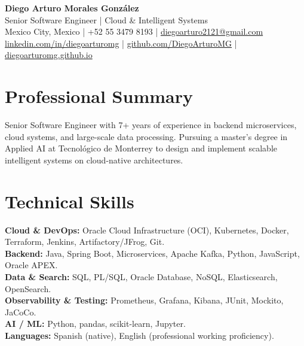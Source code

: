 \documentclass[11pt,letterpaper]{article}
\newif\ifpublic
\begin{document}
\begin{center}
{\LARGE\bfseries Diego Arturo Morales González}\\[4pt]
{\large Senior Software Engineer | Cloud \& Intelligent Systems}\\[3pt]
Mexico City, Mexico \ifpublic\else| +52 55 3479 8193 \fi| \href{mailto:diegoarturo2121@gmail.com}{diegoarturo2121@gmail.com}\\[2pt]
\href{https://www.linkedin.com/in/diegoarturomg/}{linkedin.com/in/diegoarturomg} |
\href{https://github.com/DiegoArturoMG}{github.com/DiegoArturoMG} |
\href{https://diegoarturomg.github.io/}{diegoarturomg.github.io}
\end{center}

\section{Professional Summary}
Senior Software Engineer with 7+ years of experience in backend microservices, cloud systems, and large-scale data processing. Pursuing a master's degree in Applied AI at Tecnológico de Monterrey to design and implement scalable intelligent systems on cloud-native architectures.

\section{Technical Skills}
\textbf{Cloud \& DevOps:} Oracle Cloud Infrastructure (OCI), Kubernetes, Docker, Terraform, Jenkins, Artifactory/JFrog, Git.\\
\textbf{Backend:} Java, Spring Boot, Microservices, Apache Kafka, Python, JavaScript, Oracle APEX.\\
\textbf{Data \& Search:} SQL, PL/SQL, Oracle Database, NoSQL, Elasticsearch, OpenSearch.\\
\textbf{Observability \& Testing:} Prometheus, Grafana, Kibana, JUnit, Mockito, JaCoCo.\\
\textbf{AI / ML:} Python, pandas, scikit-learn, Jupyter.\\ %
\textbf{Languages:} Spanish (native), English (professional working proficiency). %
\end{document}
